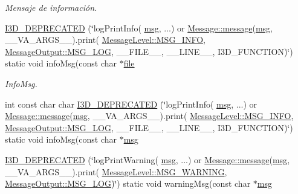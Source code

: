 \begin{DoxyCompactItemize}
\begin{DoxyCompactList}\small\item\em Mensaje de información. \end{DoxyCompactList}\item 
\hyperlink{class_i3_d_1_1_log_msg_a3210f5f7a24f6a954eafd82bcad65464}{I3\+D\+\_\+\+D\+E\+P\+R\+E\+C\+A\+T\+ED} (\char`\"{}log\+Print\+Info( \hyperlink{class_i3_d_1_1_log_msg_a5a1ceb27d9529de8eb9b3fc9377e178a}{msg}, ...) or \hyperlink{class_i3_d_1_1_message_a525f877a41a1e7493188b2b720d1d254}{Message\+::message}(\hyperlink{class_i3_d_1_1_log_msg_a5a1ceb27d9529de8eb9b3fc9377e178a}{msg}, \+\_\+\+\_\+\+V\+A\+\_\+\+A\+R\+G\+S\+\_\+\+\_\+).print( \hyperlink{namespace_i3_d_a994cd716e000a4023e180dcdb9b3a9c0ad5150815f57a5219a42da2f42f90861e}{Message\+Level\+::\+M\+S\+G\+\_\+\+I\+N\+FO}, \hyperlink{namespace_i3_d_accba1eafa248ca79da818a0b72e60964a8c1a4761ebfadb227927517230ff7b02}{Message\+Output\+::\+M\+S\+G\+\_\+\+L\+OG}, \+\_\+\+\_\+\+F\+I\+L\+E\+\_\+\+\_\+, \+\_\+\+\_\+\+L\+I\+N\+E\+\_\+\+\_\+, I3\+D\+\_\+\+F\+U\+N\+C\+T\+I\+ON)\char`\"{}) static void info\+Msg(const char $\ast$\hyperlink{class_i3_d_1_1_log_msg_ab59f20d39ef112d2196371ae0636d77c}{file}
\begin{DoxyCompactList}\small\item\em Info\+Msg. \end{DoxyCompactList}\item 
int const char char \hyperlink{class_i3_d_1_1_log_msg_af056d8e2ad9e297f51051e04ca789023}{I3\+D\+\_\+\+D\+E\+P\+R\+E\+C\+A\+T\+ED} (\char`\"{}log\+Print\+Info( \hyperlink{class_i3_d_1_1_log_msg_a5a1ceb27d9529de8eb9b3fc9377e178a}{msg}, ...) or \hyperlink{class_i3_d_1_1_message_a525f877a41a1e7493188b2b720d1d254}{Message\+::message}(\hyperlink{class_i3_d_1_1_log_msg_a5a1ceb27d9529de8eb9b3fc9377e178a}{msg}, \+\_\+\+\_\+\+V\+A\+\_\+\+A\+R\+G\+S\+\_\+\+\_\+).print( \hyperlink{namespace_i3_d_a994cd716e000a4023e180dcdb9b3a9c0ad5150815f57a5219a42da2f42f90861e}{Message\+Level\+::\+M\+S\+G\+\_\+\+I\+N\+FO}, \hyperlink{namespace_i3_d_accba1eafa248ca79da818a0b72e60964a8c1a4761ebfadb227927517230ff7b02}{Message\+Output\+::\+M\+S\+G\+\_\+\+L\+OG}, \+\_\+\+\_\+\+F\+I\+L\+E\+\_\+\+\_\+, \+\_\+\+\_\+\+L\+I\+N\+E\+\_\+\+\_\+, I3\+D\+\_\+\+F\+U\+N\+C\+T\+I\+ON)\char`\"{}) static void info\+Msg(const char $\ast$\hyperlink{class_i3_d_1_1_log_msg_a5a1ceb27d9529de8eb9b3fc9377e178a}{msg}
\item 
\hyperlink{class_i3_d_1_1_log_msg_ae6ccebe5cd21bc2bcb57790a060c4561}{I3\+D\+\_\+\+D\+E\+P\+R\+E\+C\+A\+T\+ED} (\char`\"{}log\+Print\+Warning( \hyperlink{class_i3_d_1_1_log_msg_a5a1ceb27d9529de8eb9b3fc9377e178a}{msg}, ...) or \hyperlink{class_i3_d_1_1_message_a525f877a41a1e7493188b2b720d1d254}{Message\+::message}(\hyperlink{class_i3_d_1_1_log_msg_a5a1ceb27d9529de8eb9b3fc9377e178a}{msg}, \+\_\+\+\_\+\+V\+A\+\_\+\+A\+R\+G\+S\+\_\+\+\_\+).print( \hyperlink{namespace_i3_d_a994cd716e000a4023e180dcdb9b3a9c0a124799373c019c5c7480f21a24104688}{Message\+Level\+::\+M\+S\+G\+\_\+\+W\+A\+R\+N\+I\+NG}, \hyperlink{namespace_i3_d_accba1eafa248ca79da818a0b72e60964a8c1a4761ebfadb227927517230ff7b02}{Message\+Output\+::\+M\+S\+G\+\_\+\+L\+OG})\char`\"{}) static void warning\+Msg(const char $\ast$\hyperlink{class_i3_d_1_1_log_msg_a5a1ceb27d9529de8eb9b3fc9377e178a}{msg}

\end{DoxyCompactItemize}
